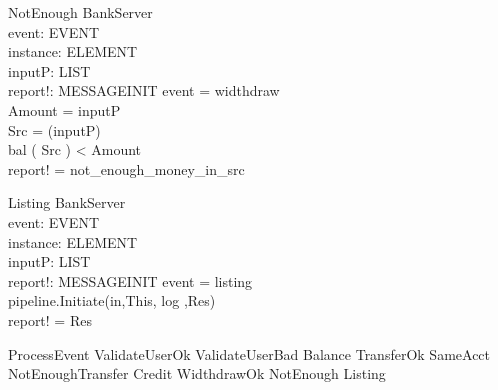 \begin{schema}{NotEnough}
\Xi BankServer \\
event: EVENT \\
instance: ELEMENT \\
inputP: LIST \\
report!: MESSAGEINIT
\where event = widthdraw \\
Amount = \head inputP \\
Src = \head (\tail inputP) \\
bal ( Src ) < Amount \\
report! = not\_enough\_money\_in\_src 
\end{schema}

\begin{schema}{Listing}
\Xi BankServer \\
event: EVENT \\
instance: ELEMENT \\
inputP: LIST \\
report!: MESSAGEINIT
\where event = listing \\
pipeline.Initiate(in,This, log ,Res)  \\
report! = Res
\end{schema}


\begin{zed} ProcessEvent \sdef  ValidateUserOk \lor   ValidateUserBad \lor  Balance \lor  TransferOk \lor SameAcct \lor NotEnoughTransfer \lor Credit \lor WidthdrawOk \lor NotEnough \lor Listing \end{zed}
